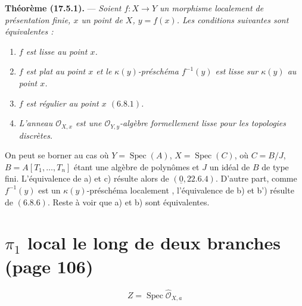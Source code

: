 \documentclass[11pt,a4paper]{article}
\begin{document}
\textbf{Théorème (17.5.1).} --- \emph{Soient $f : X \to Y$ un morphisme
localement de présentation finie, $x$ un point de $X$, $y = f(x)$. Les
conditions suivantes sont équivalentes :}

\begin{enumerate}
\item[a)] \emph{$f$ est lisse au point $x$.}
\item[b)] \emph{$f$ est plat au point $x$ et le $\kappa(y)$-préschéma
$f^{-1}(y)$ est lisse sur $\kappa(y)$ au point $x$.}
\item[b')] \emph{$f$ est régulier au point $x$ $(6.8.1)$.}
\item[c)] \emph{L'anneau $\mathcal{O}_{X,x}$ est une
$\mathcal{O}_{Y,y}$-algèbre formellement lisse pour les topologies discrètes.}
\end{enumerate}

On peut se borner au cas où $Y = \operatorname{Spec}(A)$, $X =
\operatorname{Spec}(C)$, où $C = B/J$, $B = A[T_{1}, \dots, T_{n}]$ étant une
algèbre de polynômes et $J$ un idéal de $B$ de type fini. L'équivalence de a)
et c) résulte alors de $(\underline{0}, 22.6.4)$.  D'autre part, comme $f^{-1}(y)$ est un $\kappa(y)$-préschéma localement
 , l'équivalence de b) et b') résulte de
$(6.8.6)$.  Reste à voir que a) et b) sont
équivalentes.


\section*{$\pi_{1}$ local le long de deux branches (page 106)}


\[ Z = \operatorname{Spec} \hat{\mathcal{O}}_{X,a} \]
\end{document}
